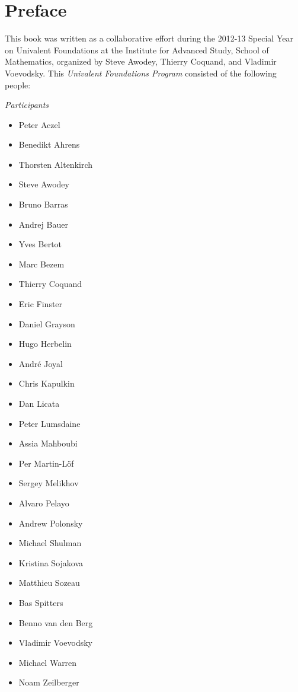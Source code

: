 \chapter*{Preface}
\label{cha:preface}


This book was written as a collaborative effort during the 2012-13 Special Year on Univalent Foundations at the Institute for Advanced Study, School of Mathematics, organized by Steve Awodey, Thierry Coquand, and Vladimir Voevodsky.  This \emph{Univalent Foundations Program} consisted of the following people:

\medskip
\centerline{\emph{Participants}}

\begin{multicols}{3}{
\begin{itemize}
\item[] Peter Aczel
\item[] Benedikt Ahrens
\item[] Thorsten Altenkirch
\item[] Steve Awodey
\item[] Bruno Barras
\item[] Andrej Bauer
\item[] Yves Bertot
\item[] Marc Bezem
\item[] Thierry Coquand
\item[] Eric Finster
\item[] Daniel Grayson
\item[] Hugo Herbelin
\item[] Andr\'e Joyal
\item[] Chris Kapulkin
\item[] Dan Licata
\item[] Peter Lumsdaine
\item[] Assia Mahboubi
\item[] Per Martin-L\"of
\item[] Sergey Melikhov
\item[] Alvaro Pelayo
\item[] Andrew Polonsky
\item[] Michael Shulman
\item[] Kristina Sojakova
\item[] Matthieu Sozeau
\item[] Bas Spitters
\item[] Benno van den Berg
\item[] Vladimir Voevodsky
\item[] Michael Warren
\item[] Noam Zeilberger
\end{itemize}
}
\end{multicols}

